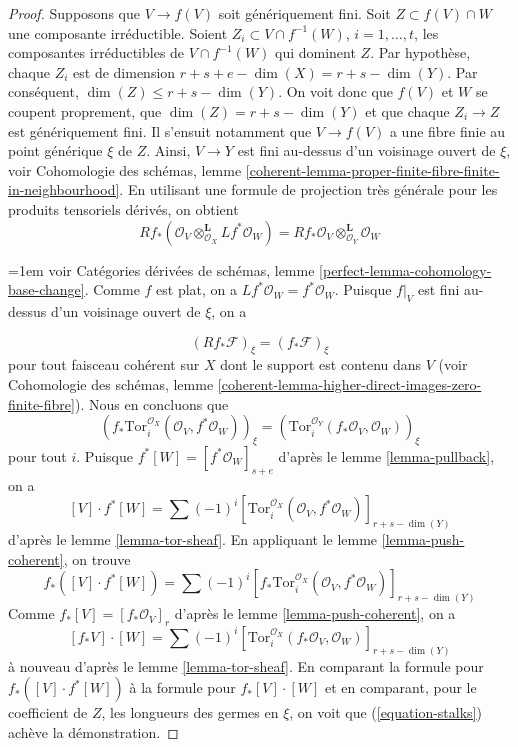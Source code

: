 \begin{proof}
\medskip\noindent
Supposons que $V \to f(V)$ soit génériquement fini. Soit $Z \subset f(V) \cap W$
une composante irréductible. Soient $Z_i \subset V \cap f^{-1}(W)$,
$i = 1, \ldots, t$, les composantes irréductibles de $V \cap f^{-1}(W)$
qui dominent $Z$. Par hypothèse, chaque $Z_i$ est de dimension
$r + s + e - \dim(X) = r + s - \dim(Y)$. Par conséquent,
$\dim(Z) \leq r + s - \dim(Y)$. On voit donc que $f(V)$ et $W$
se coupent proprement, que $\dim(Z) = r + s - \dim(Y)$ et que chaque
$Z_i \to Z$ est génériquement fini. Il s'ensuit notamment que
$V \to f(V)$ a une fibre finie au point générique $\xi$ de $Z$.
Ainsi, $V \to Y$ est fini au-dessus d'un voisinage ouvert de $\xi$, voir
Cohomologie des schémas, lemme
\ref{coherent-lemma-proper-finite-fibre-finite-in-neighbourhood}.
En utilisant une formule de projection très générale pour les produits tensoriels dérivés, on obtient
$$
Rf_*(\mathcal{O}_V \otimes_{\mathcal{O}_X}^\mathbf{L} Lf^*\mathcal{O}_W) =
Rf_*\mathcal{O}_V \otimes_{\mathcal{O}_Y}^\mathbf{L} \mathcal{O}_W
$$
{\emergencystretch=1em voir Catégories dérivées de schémas, lemme
\ref{perfect-lemma-cohomology-base-change}.
Comme $f$ est plat, on a $Lf^*\mathcal{O}_W = f^*\mathcal{O}_W$.
Puisque $f|_V$ est fini au-dessus d'un voisinage ouvert de $\xi$, on a\par}
$$
(Rf_*\mathcal{F})_\xi = (f_*\mathcal{F})_\xi
$$
pour tout faisceau cohérent sur $X$ dont le support est contenu dans $V$
(voir Cohomologie des schémas, lemme
\ref{coherent-lemma-higher-direct-images-zero-finite-fibre}). Nous
en concluons que
\begin{equation}
\label{equation-stalks}
\left(
f_*\text{Tor}_i^{\mathcal{O}_X}(\mathcal{O}_V, f^*\mathcal{O}_W)
\right)_\xi =
\left(\text{Tor}_i^{\mathcal{O}_Y}(f_*\mathcal{O}_V, \mathcal{O}_W)\right)_\xi
\end{equation}
pour tout $i$. Puisque $f^*[W] = [f^*\mathcal{O}_W]_{s + e}$ d'après le
lemme \ref{lemma-pullback}, on a
$$
[V] \cdot f^*[W] =
\sum (-1)^i
[\text{Tor}_i^{\mathcal{O}_X}(\mathcal{O}_V,
f^*\mathcal{O}_W)]_{r + s - \dim(Y)}
$$
d'après le lemme \ref{lemma-tor-sheaf}. En appliquant le
lemme \ref{lemma-push-coherent},
on trouve
$$
f_*([V] \cdot f^*[W]) =
\sum (-1)^i
[f_*\text{Tor}_i^{\mathcal{O}_X}(\mathcal{O}_V,
f^*\mathcal{O}_W)]_{r + s - \dim(Y)}
$$
Comme $f_*[V] = [f_*\mathcal{O}_V]_r$ d'après le
lemme \ref{lemma-push-coherent}, on a
$$
[f_*V] \cdot [W] =
\sum (-1)^i
[\text{Tor}_i^{\mathcal{O}_X}(f_*\mathcal{O}_V,
\mathcal{O}_W)]_{r + s - \dim(Y)}
$$
à nouveau d'après le lemme \ref{lemma-tor-sheaf}.
En comparant la formule pour $f_*([V] \cdot f^*[W])$ à
la formule pour $f_*[V] \cdot [W]$ et en comparant, pour le
coefficient de $Z$, les longueurs des germes en $\xi$, on voit que
(\ref{equation-stalks}) achève la démonstration.
\end{proof}

